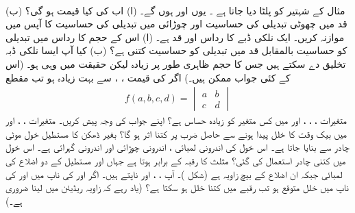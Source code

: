 \\
مثال  کے شہتیر کو پلٹا دیا جاتا ہے  ۔ یوں   اور  ہوں گے۔ (ا) اب  کی کیا قیمت ہو گی؟ (ب) قد میں چھوٹی تبدیلی کی حساسیت     اور  چوڑائی میں تبدیلی  کی  حساسیت کا آپس میں  موازنہ کریں۔  
ایک نلکی ڈبے کا رداس  اور قد  ہے۔ (ا)  اس کے  حجم کا     رداس میں تبدیلی کو حساسیت  بالمقابل قد میں تبدیلی   کو  حساسیت کتنی  ہے؟ (ب)  کیا آپ ایسا نلکی ڈبہ تخلیق دے سکتے ہیں جس کا حجم  ظاہری طور پر زیادہ   لیکن حقیقت میں  وہی ہو۔ (اس کے کئی جواب ممکن ہیں۔)
اگر  کی قیمت ، ،  سے بہت زیادہ ہو تب   مقطع 
\begin{align*}
f(a,b,c,d)=\begin{vmatrix}a&b\\ c&d \end{vmatrix}
\end{align*}
متغیرات ، ، ،  اور  میں کس متغیر کو زیادہ حساس ہے؟ اپنے جواب  کی وجہ پیش کریں۔
 متغیرات ، ،  اور  میں بیک وقت    کا خلل   پیدا ہونے سے حاصل ضرب  پر کتنا اثر ہو گا؟
بغیر ڈھکن  کا مستطیل  خول      موٹی چادر سے بنایا جاتا ہے۔ اس خول کی اندرونی لمبائی ،  اندرونی چوڑائی  اور اندرونی گہرائی  ہے۔ اس خول میں کتنی چادر استعمال کی گئی؟
مثلث  کا رقبہ   کے برابر ہوتا ہے جہاں  اور  مستطیل کے دو اضلاع کی لمبائی جبکہ  ان  اضلاع  کے بیچ زاویہ ہے (شکل )۔ آپ ،
 ،  اور  ناپتے ہیں۔ اگر  اور  کی ناپ میں  اور  کی ناپ میں   خلل متوقع ہو تب  رقبے  میں کتنا خلل ہو سکتا ہے؟ (یاد رہے کہ زاویہ   ریڈیئن میں لینا ضروری ہے۔) 
